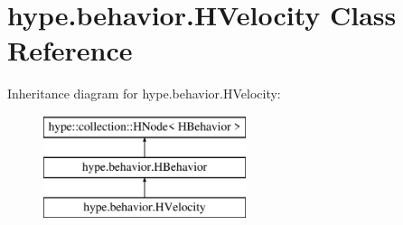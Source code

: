 \hypertarget{classhype_1_1behavior_1_1_h_velocity}{\section{hype.\-behavior.\-H\-Velocity Class Reference}
\label{classhype_1_1behavior_1_1_h_velocity}
}
Inheritance diagram for hype.\-behavior.\-H\-Velocity\-:\begin{figure}[H]
\begin{center}
\leavevmode
\includegraphics[height=3.000000cm]{classhype_1_1behavior_1_1_h_velocity}
\end{center}
\end{figure}
